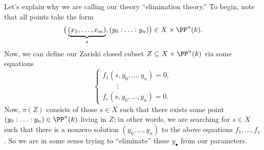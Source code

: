 \documentclass[../notes.tex]{subfiles}
\begin{document}
Let's explain why we are calling our theory ``elimination theory.'' To begin, note that all points take the form
\[\big(\underbrace{(x_1,\ldots,x_m)}_s,(y_0:\ldots:y_n)\big)\in X\times\PP^{n}(k).\]
Now, we can define our Zariski closed subset $Z\subseteq X\times\PP^n(k)$ via some equations
\[\begin{cases}
	f_1(s,y_0,\ldots,y_n)=0, \\
	\quad\quad\vdots \\
	f_r(s,y_0,\ldots,y_n)=0.
\end{cases}\]
Now, $\pi(Z)$ consists of those $s\in X$ such that there exists some point $(y_0:\ldots:y_n)\in\PP^n(k)$ living in $Z$; in other words, we are searching for $s\in X$ such that there is a nonzero solution $(y_0,\ldots,y_n)$ to the above equations $f_1,\ldots,f_s$. So we are in some sense trying to ``eliminate'' these $y_\bullet$ from our parameters.
\end{document}
